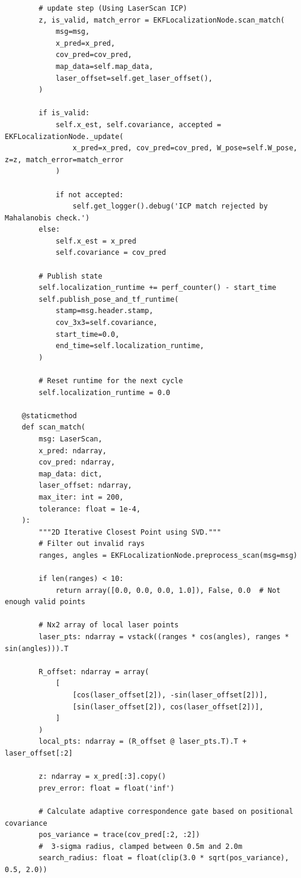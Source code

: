 \begin{verbatim}
        # update step (Using LaserScan ICP)
        z, is_valid, match_error = EKFLocalizationNode.scan_match(
            msg=msg,
            x_pred=x_pred,
            cov_pred=cov_pred,
            map_data=self.map_data,
            laser_offset=self.get_laser_offset(),
        )

        if is_valid:
            self.x_est, self.covariance, accepted = EKFLocalizationNode._update(
                x_pred=x_pred, cov_pred=cov_pred, W_pose=self.W_pose, z=z, match_error=match_error
            )

            if not accepted:
                self.get_logger().debug('ICP match rejected by Mahalanobis check.')
        else:
            self.x_est = x_pred
            self.covariance = cov_pred

        # Publish state
        self.localization_runtime += perf_counter() - start_time
        self.publish_pose_and_tf_runtime(
            stamp=msg.header.stamp,
            cov_3x3=self.covariance,
            start_time=0.0,
            end_time=self.localization_runtime,
        )

        # Reset runtime for the next cycle
        self.localization_runtime = 0.0

    @staticmethod
    def scan_match(
        msg: LaserScan,
        x_pred: ndarray,
        cov_pred: ndarray,
        map_data: dict,
        laser_offset: ndarray,
        max_iter: int = 200,
        tolerance: float = 1e-4,
    ):
        """2D Iterative Closest Point using SVD."""
        # Filter out invalid rays
        ranges, angles = EKFLocalizationNode.preprocess_scan(msg=msg)

        if len(ranges) < 10:
            return array([0.0, 0.0, 0.0, 1.0]), False, 0.0  # Not enough valid points

        # Nx2 array of local laser points
        laser_pts: ndarray = vstack((ranges * cos(angles), ranges * sin(angles))).T

        R_offset: ndarray = array(
            [
                [cos(laser_offset[2]), -sin(laser_offset[2])],
                [sin(laser_offset[2]), cos(laser_offset[2])],
            ]
        )
        local_pts: ndarray = (R_offset @ laser_pts.T).T + laser_offset[:2]

        z: ndarray = x_pred[:3].copy()
        prev_error: float = float('inf')

        # Calculate adaptive correspondence gate based on positional covariance
        pos_variance = trace(cov_pred[:2, :2])
        #  3-sigma radius, clamped between 0.5m and 2.0m
        search_radius: float = float(clip(3.0 * sqrt(pos_variance), 0.5, 2.0))


\end{verbatim}
